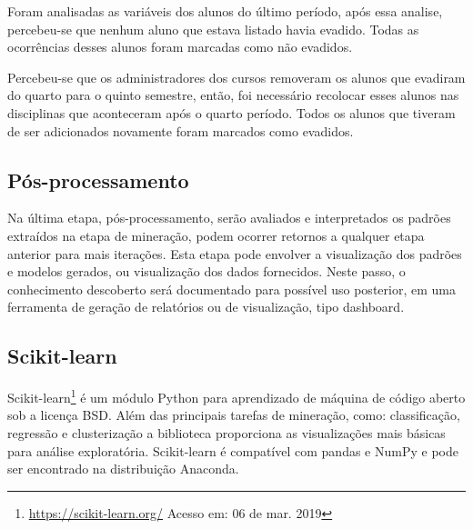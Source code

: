 Foram analisadas as variáveis dos alunos do último período, após essa analise,
percebeu-se que nenhum aluno que estava listado havia evadido. Todas as
ocorrências desses alunos foram marcadas como não evadidos.

Percebeu-se que os administradores dos cursos removeram os alunos que evadiram
do quarto para o quinto semestre, então, foi necessário recolocar esses alunos
nas disciplinas que aconteceram após o quarto período. Todos os alunos que
tiveram de ser adicionados novamente foram marcados como evadidos.

\subsection{Pós-processamento}

Na última etapa, pós-processamento, serão avaliados e interpretados os padrões
extraídos na etapa de mineração, podem ocorrer retornos a qualquer etapa
anterior para mais iterações. Esta etapa pode envolver a visualização dos
padrões e modelos gerados, ou visualização dos dados fornecidos. Neste passo, o
conhecimento descoberto será documentado para possível uso posterior, em uma
ferramenta de geração de relatórios ou de visualização, tipo dashboard.

\subsection{Scikit-learn}

Scikit-learn\footnote{\url{https://scikit-learn.org/} Acesso em: 06 de mar.
2019} é um módulo Python para aprendizado de máquina de código aberto sob a
licença BSD. Além das principais tarefas de mineração, como: classificação,
regressão e clusterização a biblioteca proporciona as visualizações mais básicas
para análise exploratória. Scikit-learn é compatível com pandas e NumPy e pode
ser encontrado na distribuição Anaconda.
